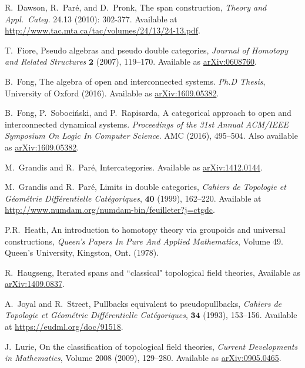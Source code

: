\documentclass[11pt]{amsart}
\theoremstyle{remark}
\theoremstyle{definition}
\begin{document}
\begin{thebibliography}{100}
R.~Dawson, R.~Par\'{e}, and D.~Pronk, 
The span construction, 
\emph{Theory and Appl.~Categ.} 
24.13 (2010): 302-377.
Available at \href{http://www.tac.mta.ca/tac/volumes/24/13/24-13.pdf}{http://www.tac.mta.ca/tac/volumes/24/13/24-13.pdf}.

T.~Fiore, 
Pseudo algebras and pseudo double categories, 
\emph{Journal of Homotopy and Related Structures} $\mathbf{2}$ 
(2007), 119--170. 
Available as \href{http://arxiv.org/abs/math/0608760}{arXiv:0608760}.

B.~Fong,
The algebra of open and interconnected systems.
\emph{Ph.D Thesis},
University of Oxford (2016).
Available as \href{https://arxiv.org/abs/1609.05382}{arXiv:1609.05382}.

B.~Fong, P.~Soboci\'{n}ski, and P.~Rapisarda,
A categorical approach to open and interconnected dynamical systems.
\emph{Proceedings of the 31st Annual ACM/IEEE Symposium On Logic In Computer Science}.
AMC (2016), 495--504.
Also available as \href{https://arxiv.org/abs/1609.05382}{arXiv:1609.05382}.

M.~Grandis and R.~Par\'{e}, 
Intercategories.
Available as \href{https://arxiv.org/abs/1412.0144}{arXiv:1412.0144}.

M.~Grandis and R.~Par\'{e}, 
Limits in double categories, 
\emph{Cahiers de Topologie et G\'{e}om\'{e}trie Diff\'{e}rentielle Cat\'{e}goriques}, $\mathbf{40}$  
(1999), 162--220. 
Available at \href{http://www.numdam.org/numdam-bin/feuilleter?j=ctgdc}{http://www.numdam.org/numdam-bin/feuilleter?j=ctgdc}.

P.R.\ Heath,
An introduction to homotopy theory via groupoids and universal constructions,
\emph{Queen’s Papers In Pure And Applied Mathematics}, Volume 49.
Queen’s University,  Kingston, Ont. (1978).

R.\ Haugseng,
Iterated spans and ``classical" topological field theories,
Available as \href{https://arxiv.org/abs/1409.0837}{arXiv:1409.0837}.

A.\ Joyal and R.\ Street,
Pullbacks equivalent to pseudopullbacks,
\emph{Cahiers de Topologie et G\'{e}om\'{e}trie Diff\'{e}rentielle Cat\'{e}goriques}, $\mathbf{34}$
(1993), 153--156.
Available at \href{https://eudml.org/doc/91518}{https://eudml.org/doc/91518}.

J.~Lurie,
On the classification of topological field theories,
\emph{Current Developments in Mathematics},
Volume 2008 (2009), 129--280.
Available as \href{https://arxiv.org/abs/0905.0465}{arXiv:0905.0465}.


\end{thebibliography}
\end{document}
